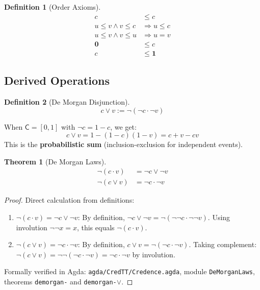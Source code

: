\documentclass[11pt,a4paper]{article}
\newtheorem{definition}{Definition}[section]
\newtheorem{theorem}{Theorem}[section]
\newcommand{\C}{\mathsf{C}}
\newcommand{\one}{\mathbf{1}}
\newcommand{\zero}{\mathbf{0}}
\newcommand{\negc}{\neg}
\begin{document}
\begin{definition}[Order Axioms]
\begin{align}
c &\leq c \tag{refl} \\
u \leq v \land v \leq c &\Rightarrow u \leq c \tag{trans} \\
u \leq v \land v \leq u &\Rightarrow u = v \tag{antisym} \\
\zero &\leq c \tag{zero-least} \\
c &\leq \one \tag{one-greatest}
\end{align}
\end{definition}

\subsection{Derived Operations}

\begin{definition}[De Morgan Disjunction]
\[
c \vee v := \negc(\negc c \cdot \negc v)
\]
\end{definition}

When $\C = {[0,1]}$ with $\negc c = 1 - c$, we get:
\[
c \vee v = 1 - (1-c)(1-v) = c + v - cv
\]
This is the \textbf{probabilistic sum} (inclusion-exclusion for independent events).

\begin{theorem}[De Morgan Laws]\label{thm:demorgan}
\begin{align}
\negc(c \cdot v) &= \negc c \vee \negc v \\
\negc(c \vee v) &= \negc c \cdot \negc v
\end{align}
\end{theorem}

\begin{proof}
Direct calculation from definitions:
\begin{enumerate}
    \item $\negc(c \cdot v) = \negc c \vee \negc v$: By definition, $\negc c \vee \negc v = \negc(\negc\negc c \cdot \negc\negc v)$. Using involution $\negc\negc x = x$, this equals $\negc(c \cdot v)$.
    \item $\negc(c \vee v) = \negc c \cdot \negc v$: By definition, $c \vee v = \negc(\negc c \cdot \negc v)$. Taking complement: $\negc(c \vee v) = \negc\negc(\negc c \cdot \negc v) = \negc c \cdot \negc v$ by involution.
\end{enumerate}
Formally verified in Agda: \texttt{agda/CredTT/Credence.agda}, module \texttt{DeMorganLaws}, theorems \texttt{demorgan-\textperiodcentered} and \texttt{demorgan-\(\vee\)}.
\end{proof}
\end{document}

